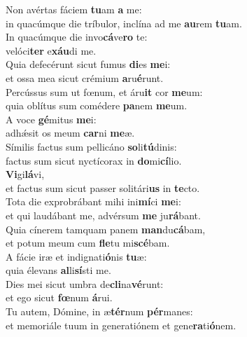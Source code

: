 \evenverse Non avértas fáciem \textbf{tu}am \textbf{a} me:~\*\\
\evenverse in quacúmque die tríbulor, inclína ad me \textbf{au}rem \textbf{tu}am.\\
\oddverse In quacúmque die invo\textbf{cá}ve\textbf{ro} te:~\*\\
\oddverse velóci\textbf{ter} e\textbf{xáu}di me.\\
\evenverse Quia defecérunt sicut fumus \textbf{di}es \textbf{me}i:~\*\\
\evenverse et ossa mea sicut crémium \textbf{a}ru\textbf{é}runt.\\
\oddverse Percússus sum ut fœnum, et áru\textbf{it} cor \textbf{me}um:~\*\\
\oddverse quia oblítus sum comédere \textbf{pa}nem \textbf{me}um.\\
\evenverse A voce \textbf{gé}mitus \textbf{me}i:~\*\\
\evenverse adhǽsit os meum \textbf{car}ni \textbf{me}æ.\\
\oddverse Símilis factus sum pellicáno \textbf{so}li\textbf{tú}dinis:~\*\\
\oddverse factus sum sicut nyctícorax in \textbf{do}mi\textbf{cí}lio.\\
\evenverse \textbf{Vi}gi\textbf{lá}vi,~\*\\
\evenverse et factus sum sicut passer solitári\textbf{us} in \textbf{te}cto.\\
\oddverse Tota die exprobrábant mihi ini\textbf{mí}ci \textbf{me}i:~\*\\
\oddverse et qui laudábant me, advérsum \textbf{me} ju\textbf{rá}bant.\\
\evenverse Quia cínerem tamquam panem \textbf{man}du\textbf{cá}bam,~\*\\
\evenverse et potum meum cum \textbf{fle}tu mi\textbf{scé}bam.\\
\oddverse A fácie iræ et indignati\textbf{ó}nis \textbf{tu}æ:~\*\\
\oddverse quia élevans \textbf{al}li\textbf{sí}sti me.\\
\evenverse Dies mei sicut umbra de\textbf{cli}na\textbf{vé}runt:~\*\\
\evenverse et ego sicut \textbf{fœ}num \textbf{á}rui.\\
\oddverse Tu autem, Dómine, in æ\textbf{tér}num \textbf{pér}manes:~\*\\
\oddverse et memoriále tuum in generatiónem et gene\textbf{ra}ti\textbf{ó}nem.\\
